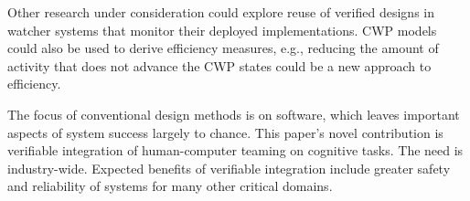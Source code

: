 Other research under consideration could explore reuse of verified designs in watcher systems that monitor their deployed implementations. CWP models could also be used to derive efficiency measures, e.g., reducing the amount of activity that does not advance the CWP states could be a new approach to efficiency.  

The focus of conventional design methods is on software, which leaves important aspects of system success largely to chance. 
This paper's novel contribution is verifiable integration of human-computer teaming on cognitive tasks. 
The need is industry-wide. 
Expected benefits of verifiable integration include greater safety and reliability of systems for many other critical domains. 
